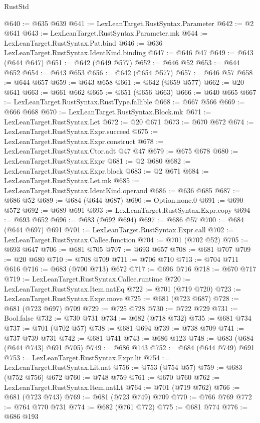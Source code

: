 \begin{lexlean}{RustStd}
\begin{coremodule}
@640 := @635 @639
@641 := LexLeanTarget.RustSyntax.Parameter
@642 := @2 @641
@643 := LexLeanTarget.RustSyntax.Parameter.mk
@644 := LexLeanTarget.RustSyntax.Pat.bind
@646 := @636 LexLeanTarget.RustSyntax.IdentKind.binding
@647 := @646 @47
@649 := @643 (@644 @647)
@651 := @642 (@649 @577)
@652 := @646 @52
@653 := @644 @652
@654 := @643 @653
@656 := @642 (@654 @577)
@657 := @646 @57
@658 := @644 @657
@659 := @643 @658
@661 := @642 (@659 @577)
@662 := @20 @641
@663 := @661 @662
@665 := @651 (@656 @663)
@666 := @640 @665
@667 := LexLeanTarget.RustSyntax.RustType.fallible
@668 := @667 @566
@669 := @666 @668
@670 := LexLeanTarget.RustSyntax.Block.mk
@671 := LexLeanTarget.RustSyntax.Let
@672 := @20 @671
@673 := @670 @672
@674 := LexLeanTarget.RustSyntax.Expr.succeed
@675 := LexLeanTarget.RustSyntax.Expr.construct
@678 := LexLeanTarget.RustSyntax.Ctor.adt @47 @47
@679 := @675 @678
@680 := LexLeanTarget.RustSyntax.Expr
@681 := @2 @680
@682 := LexLeanTarget.RustSyntax.Expr.block
@683 := @2 @671
@684 := LexLeanTarget.RustSyntax.Let.mk
@685 := LexLeanTarget.RustSyntax.IdentKind.operand
@686 := @636 @685
@687 := @686 @52
@689 := @684 (@644 @687)
@690 := Option.none.{0}
@691 := @690 @572
@692 := @689 @691
@693 := LexLeanTarget.RustSyntax.Expr.copy
@694 := @693 @652
@696 := @683 (@692 @694)
@697 := @686 @57
@700 := @684 (@644 @697) @691
@701 := LexLeanTarget.RustSyntax.Expr.call
@702 := LexLeanTarget.RustSyntax.Callee.function
@704 := @701 (@702 @52)
@705 := @693 @647
@706 := @681 @705
@707 := @693 @657
@708 := @681 @707
@709 := @20 @680
@710 := @708 @709
@711 := @706 @710
@713 := @704 @711 @616
@716 := @683 (@700 @713) @672
@717 := @696 @716
@718 := @670 @717
@719 := LexLeanTarget.RustSyntax.Callee.runtime
@720 := LexLeanTarget.RustSyntax.Item.natEq
@722 := @701 (@719 @720)
@723 := LexLeanTarget.RustSyntax.Expr.move
@725 := @681 (@723 @687)
@728 := @681 (@723 @697) @709
@729 := @725 @728
@730 := @722 @729
@731 := Bool.false
@732 := @730 @731
@734 := @682 (@718 @732)
@735 := @681 @734
@737 := @701 (@702 @57)
@738 := @681 @694
@739 := @738 @709
@741 := @737 @739 @731
@742 := @681 @741
@743 := @686 @123
@748 := @683 (@684 (@644 @743) @691 @705)
@749 := @686 @143
@752 := @684 (@644 @749) @691
@753 := LexLeanTarget.RustSyntax.Expr.lit
@754 := LexLeanTarget.RustSyntax.Lit.nat
@756 := @753 (@754 @57)
@759 := @683 (@752 @756) @672
@760 := @748 @759
@761 := @670 @760
@762 := LexLeanTarget.RustSyntax.Item.natLt
@764 := @701 (@719 @762)
@766 := @681 (@723 @743)
@769 := @681 (@723 @749) @709
@770 := @766 @769
@772 := @764 @770 @731
@774 := @682 (@761 @772)
@775 := @681 @774
@776 := @686 @193

\end{coremodule}
\end{lexlean}
